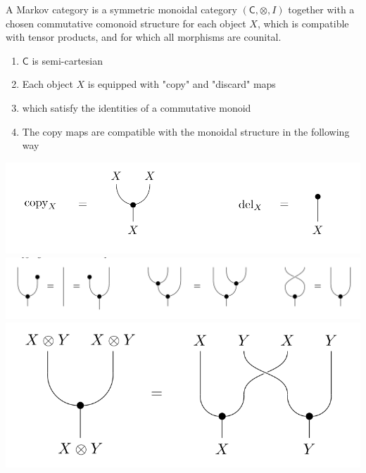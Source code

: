 \begin{frame}
    \begin{definition}
        A Markov category is a symmetric monoidal category $(\mathsf{C}, \otimes, I)$ together with a chosen commutative comonoid structure for each object $X$, which is compatible with tensor products, and for which all morphisms are counital.
    \end{definition}
    \begin{minipage}{.48\textwidth}
        \begin{enumerate}
            \item $\mathsf{C}$ is semi-cartesian
            \item Each object $X$ is equipped with "copy" and "discard" maps
            \item which satisfy the identities of a commutative monoid
            \item The copy maps are compatible with the monoidal structure in the following way
        \end{enumerate}
    \end{minipage}
    \hfill
    \begin{minipage}{.48\textwidth}
        \includegraphics[width=\textwidth]{graphics/string/markov_copy_delete.png}
        \includegraphics[width=\textwidth]{graphics/string/markov_commutative_monoid.png}
        \includegraphics[width=\textwidth]{graphics/string/markov_monoidal_compat.png}
    \end{minipage}
\end{frame}
